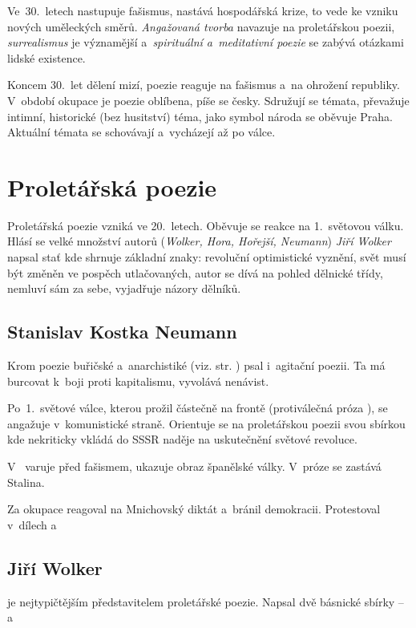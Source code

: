 Ve~30.~letech nastupuje fašismus, nastává hospodářská krize, to vede ke
vzniku nových uměleckých směrů. \emph{Angažovaná tvorba} navazuje na
proletářskou poezii, \emph{surrealismus} je významější
a~\emph{spirituální a~meditativní poezie} se zabývá otázkami lidské
existence.

Koncem 30.~let dělení mizí, poezie reaguje na fašismus a~na ohrožení
republiky. V~období okupace je poezie oblíbena, píše se česky.
Sdružují se témata, převažuje intimní, historické (bez husitství) téma,
jako symbol národa se oběvuje Praha. Aktuální témata se schovávají
a~vycházejí až po válce.

\section{Proletářská poezie}
Proletářská poezie vzniká ve 20.~letech. Oběvuje se reakce na
1.~světovou válku. Hlásí se velké množství autorů (\emph{Wolker, Hora,
Hořejší, Neumann}) 
\emph{Jiří Wolker} napsal stať  kde shrnuje základní
znaky: revoluční optimistické vyznění, svět musí být změněn ve pospěch
utlačovaných, autor se dívá na pohled dělnické třídy, nemluví sám za sebe,
vyjadřuje názory dělníků.

\subsection*{Stanislav Kostka Neumann}
\label{chap:SKNagit}
Krom poezie buřičské a~anarchistiké (viz. str. \pageref{chap:SKNbur})
psal  i~agitační poezii. Ta má burcovat k~boji proti kapitalismu,
vyvolává nenávist.

Po~1.~světové válce, kterou prožil částečně na frontě (protiválečná
próza ), se angažuje v~komunistické straně. Orientuje
se na proletářskou poezii svou sbírkou  kde nekriticky
vkládá do SSSR naděje na uskutečnění světové revoluce.

V~ varuje před fašismem, ukazuje
obraz španělské války. V~próze  se zastává Stalina.

Za okupace reagoval na Mnichovský diktát a~bránil demokracii.
Protestoval v~dílech  a~

\subsection*{Jiří Wolker}
 je nejtypičtějším představitelem proletářské poezie.
Napsal dvě básnické sbírky --  a~

